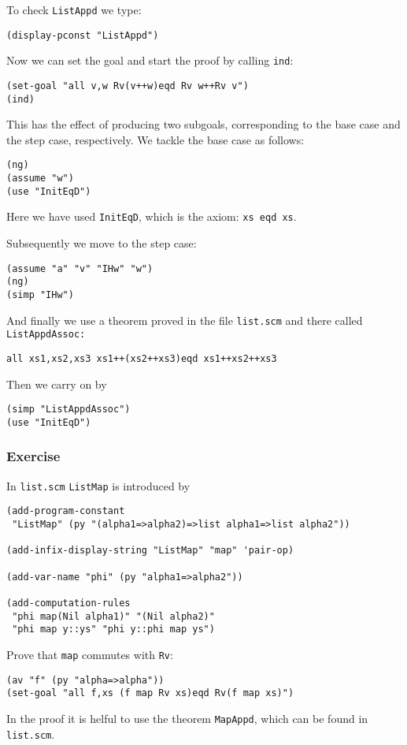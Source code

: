 \documentclass[12pt]{amsart}
\begin{document}
To check \texttt{ListAppd} we type:
\begin{verbatim}
(display-pconst "ListAppd")
\end{verbatim}

Now we can set the goal and start the proof by calling \texttt{ind}:
\begin{verbatim}
(set-goal "all v,w Rv(v++w)eqd Rv w++Rv v")
(ind)
\end{verbatim}

This has the effect of producing two subgoals, corresponding to the
base case and the step case, respectively.  We tackle the base case as
follows:
\begin{verbatim}
(ng)
(assume "w")
(use "InitEqD")
\end{verbatim}
Here we have used \texttt{InitEqD}, which is the axiom: \texttt{xs eqd
  xs}.

Subsequently we move to the step case:
\begin{verbatim}
(assume "a" "v" "IHw" "w")
(ng)
(simp "IHw")
\end{verbatim}

And finally we use a theorem proved in the file \texttt{list.scm} and
there called \texttt{ListAppdAssoc:}
\begin{verbatim}
all xs1,xs2,xs3 xs1++(xs2++xs3)eqd xs1++xs2++xs3
\end{verbatim}
Then we carry on by
\begin{verbatim}
(simp "ListAppdAssoc")
(use "InitEqD")
\end{verbatim}

\subsubsection{Exercise}
In \texttt{list.scm} \texttt{ListMap} is introduced by
\begin{verbatim}
(add-program-constant
 "ListMap" (py "(alpha1=>alpha2)=>list alpha1=>list alpha2"))

(add-infix-display-string "ListMap" "map" 'pair-op)

(add-var-name "phi" (py "alpha1=>alpha2"))

(add-computation-rules
 "phi map(Nil alpha1)" "(Nil alpha2)"
 "phi map y::ys" "phi y::phi map ys")
\end{verbatim}
Prove that \verb|map| commutes with \texttt{Rv}:
\begin{verbatim}
(av "f" (py "alpha=>alpha"))
(set-goal "all f,xs (f map Rv xs)eqd Rv(f map xs)")
\end{verbatim}
In the proof it is helful to use the theorem \texttt{MapAppd}, which
can be found in \texttt{list.scm}.
\end{document}
